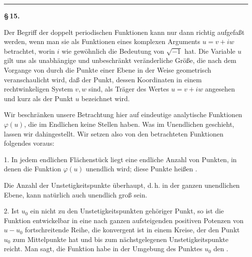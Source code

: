 
\begin{center}

\medskip
\textbf{}
\end{center}

\bigskip
\begin{center}\rule{2cm}{0.4pt}\end{center}
\bigskip

\begin{center}
\textbf{\S\,15. }
\end{center}

Der Begriff der doppelt periodischen Funktionen kann nur dann richtig aufgefaßt werden, wenn man sie als Funktionen eines komplexen Arguments $u = v + iw$ betrachtet, worin $i$ wie gewöhnlich die Bedeutung von $\sqrt{-1}$ hat. Die Variable $u$ gilt uns als unabhängige und unbeschränkt veränderliche Größe, die nach dem Vorgange von  durch die Punkte einer Ebene in der Weise geometrisch veranschaulicht wird, daß der Punkt, dessen Koordinaten in einem rechtwinkeligen System $v, w$ sind, als Träger des Wertes $u = v + iw$ angesehen und kurz als der Punkt $u$ bezeichnet wird.

Wir beschränken unsere Betrachtung hier auf eindeutige analytische Funktionen $\varphi(u)$, die im Endlichen keine  Stellen haben. Was im Unendlichen geschieht, lassen wir dahingestellt. Wir setzen also von den betrachteten Funktionen folgendes voraus:

1. In jedem endlichen Flächenstück liegt eine endliche Anzahl von Punkten, in denen die Funktion $\varphi(u)$ unendlich wird; diese Punkte heißen .

Die Anzahl der Unstetigkeitspunkte überhaupt, d.\,h. in der ganzen unendlichen Ebene, kann natürlich auch unendlich groß sein.

2. Ist $u_0$ ein nicht zu den Unstetigkeitspunkten gehöriger Punkt, so ist die Funktion entwickelbar in eine nach ganzen aufsteigenden positiven Potenzen von $u - u_0$ fortschreitende Reihe, die konvergent ist in einem Kreise, der den Punkt $u_0$ zum Mittelpunkte hat und bis zum nächstgelegenen Unstetigkeitspunkte reicht. Man sagt, die Funktion habe in der Umgebung des Punktes $u_0$ den .
